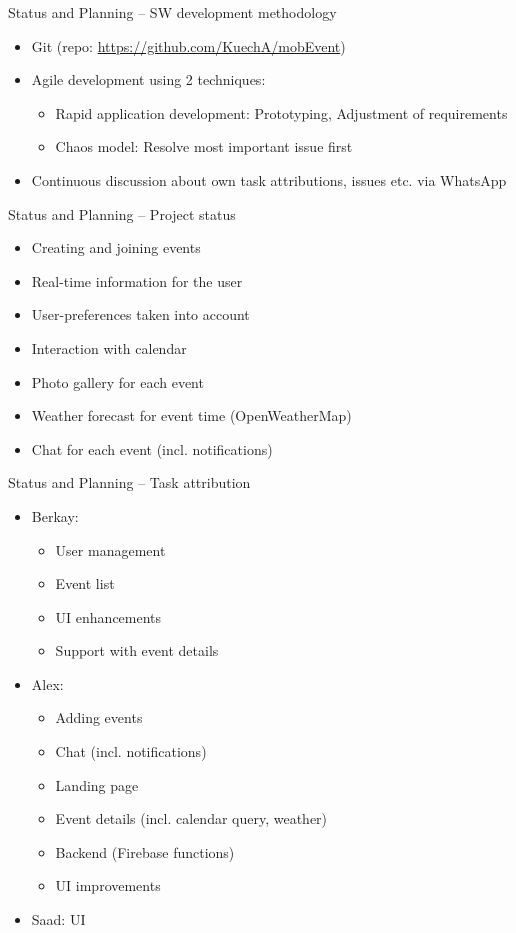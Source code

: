 \documentclass[logo=EURECOM,english]{eurecombeamer}
\begin{document}
\begin{frame}{Status and Planning -- SW development methodology}
\begin{itemize}
\item Git (repo: \url{https://github.com/KuechA/mobEvent})
\item Agile development using 2 techniques:
	\begin{itemize}
	\item Rapid application development: Prototyping, Adjustment of requirements
	\item Chaos model: Resolve most important issue first
	\end{itemize}
\item Continuous discussion about own task attributions, issues etc. via WhatsApp
\end{itemize}
\end{frame}

\begin{frame}{Status and Planning -- Project status}
\begin{itemize}
\item Creating and joining events
\item Real-time information for the user
\item User-preferences taken into account
\item Interaction with calendar
\item Photo gallery for each event
\item Weather forecast for event time (OpenWeatherMap)
\item Chat for each event (incl. notifications)
\end{itemize}
\end{frame}

\begin{frame}{Status and Planning -- Task attribution}
\begin{itemize}
\item Berkay:
	\begin{itemize}
	\item User management
	\item Event list
	\item UI enhancements
	\item Support with event details
	\end{itemize}
\item Alex:
	\begin{itemize}
	\item Adding events
	\item Chat (incl. notifications)
	\item Landing page
	\item Event details (incl. calendar query, weather)
	\item Backend (Firebase functions)
	\item UI improvements
	\end{itemize}
\item Saad: UI
\end{itemize}
\end{frame}

\begin{frame}
\end{frame}

\begin{frame}
\end{frame}
\end{document}
